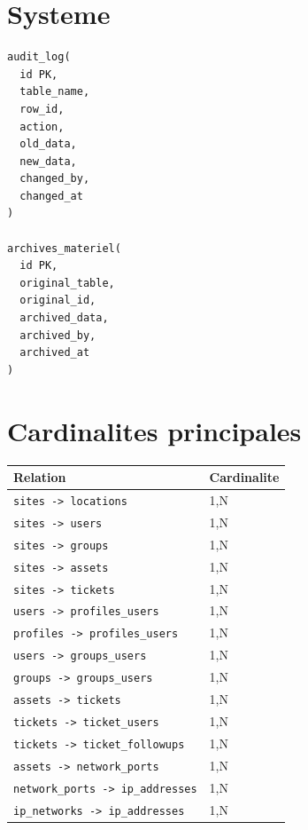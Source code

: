 \documentclass[11pt,a4paper]{article}
\begin{document}
\section{Systeme}

\begin{Verbatim}[fontsize=\small]
audit_log(
  id PK,
  table_name,
  row_id,
  action,
  old_data,
  new_data,
  changed_by,
  changed_at
)

archives_materiel(
  id PK,
  original_table,
  original_id,
  archived_data,
  archived_by,
  archived_at
)
\end{Verbatim}

\section{Cardinalites principales}

\begin{longtable}{|p{8cm}|p{4cm}|}
\hline
\textbf{Relation} & \textbf{Cardinalite} \\
\hline
\texttt{sites -> locations} & 1,N \\
\hline
\texttt{sites -> users} & 1,N \\
\hline
\texttt{sites -> groups} & 1,N \\
\hline
\texttt{sites -> assets} & 1,N \\
\hline
\texttt{sites -> tickets} & 1,N \\
\hline
\texttt{users -> profiles\_users} & 1,N \\
\hline
\texttt{profiles -> profiles\_users} & 1,N \\
\hline
\texttt{users -> groups\_users} & 1,N \\
\hline
\texttt{groups -> groups\_users} & 1,N \\
\hline
\texttt{assets -> tickets} & 1,N \\
\hline
\texttt{tickets -> ticket\_users} & 1,N \\
\hline
\texttt{tickets -> ticket\_followups} & 1,N \\
\hline
\texttt{assets -> network\_ports} & 1,N \\
\hline
\texttt{network\_ports -> ip\_addresses} & 1,N \\
\hline
\texttt{ip\_networks -> ip\_addresses} & 1,N \\
\hline
\end{longtable}
\end{document}
